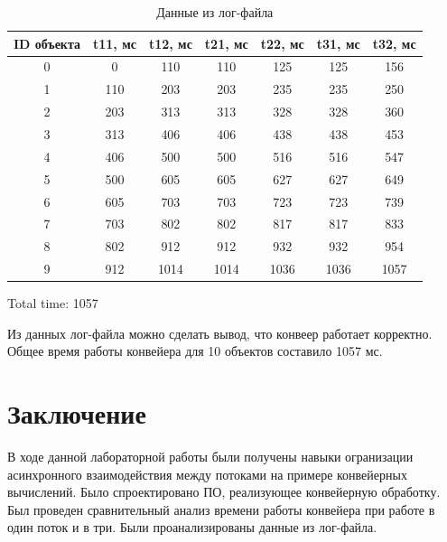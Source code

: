 \documentclass[a4paper,14pt]{report}
\begin{document}
\begin{table}[!h]
	\caption{Данные из лог-файла}
	\tabcolsep=0.11cm
		\begin{tabular}{| c | c | c | c | c | c | c |}
	 	\hline
		ID объекта & t11, мс & t12, мс & t21, мс & t22, мс & t31, мс & t32, мс \\ [0.5ex]
	 	\hline\hline
		0	& 	0 &  110 & 110 & 125 & 125 & 156  \\ \hline
		1	&	110 & 203  & 203  & 235  & 235  & 250 \\ \hline 
		2	&	203  & 313 & 313  & 328  & 328  & 360 \\ \hline 
		3	&	313  & 406 & 406  & 438  & 438  & 453 \\ \hline 
		4	&	406  & 500  & 500  & 516  & 516  & 547 \\ \hline  
		5	&	500  & 605  & 605  & 627  & 627  & 649 \\ \hline 
		6	&	605  & 703  & 703  & 723  & 723  & 739 \\ \hline 
		7	&	703  & 802  & 802  & 817  & 817  & 833 \\ \hline 
		8	&	802  & 912  & 912  & 932  & 932  & 954 \\ \hline 
		9	&	912  & 1014  & 1014  & 1036  & 1036  & 1057 \\ \hline 
	\end{tabular}
\end{table}

Total time: 1057

Из данных лог-файла можно сделать вывод, что конвеер работает корректно. Общее время работы конвейера для 10 объектов составило 1057 мс.

\chapter*{Заключение}

В ходе данной лабораторной работы были получены навыки огранизации асинхронного взаимодействия между потоками на примере конвейерных вычислений. Было спроектировано ПО, реализующее конвейерную обработку. Был проведен сравнительный анализ времени работы конвейера при работе в один поток и в три. Были проанализированы данные из лог-файла.
\end{document}
